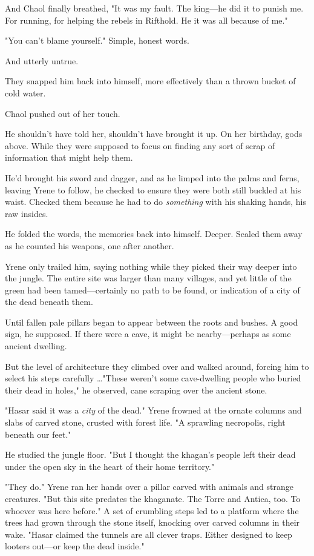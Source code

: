 And Chaol finally breathed, "It was my fault. The king---he did it to punish me. For running, for helping the rebels in Rifthold. He 
it was all because of me."

"You can't blame yourself." Simple, honest words.

And utterly untrue.

They snapped him back into himself, more effectively than a thrown bucket of cold water.

Chaol pushed out of her touch.

He shouldn't have told her, shouldn't have brought it up. On her birthday, gods above. While they were supposed to focus on finding any sort of scrap of information that might help them.

He'd brought his sword and dagger, and as he limped into the palms and ferns, leaving Yrene to follow, he checked to ensure they were both still buckled at his waist. Checked them because he had to do
\emph{something} with his shaking hands, his raw insides.

He folded the words, the memories back into himself. Deeper. Sealed them away as he counted his weapons, one after another.

Yrene only trailed him, saying nothing while they picked their way deeper into the jungle. The entire site was larger than many villages, and yet little of the green had been tamed---certainly no path to be found, or indication of a city of the dead beneath them.

Until fallen pale pillars began to appear between the roots and bushes. A good sign, he supposed. If there were a cave, it might be nearby---perhaps as some ancient dwelling.

But the level of architecture they climbed over and walked around, forcing him to select his steps carefully \ldots"These weren't some cave-dwelling people who buried their dead in holes," he observed, cane scraping over the ancient stone.

"Hasar said it was a \emph{city} of the dead." Yrene frowned at the ornate columns and slabs of carved stone, crusted with forest life. "A sprawling necropolis, right beneath our feet."

He studied the jungle floor. "But I thought the khagan's people left their dead under the open sky in the heart of their home territory."

"They do." Yrene ran her hands over a pillar carved with animals and strange creatures. "But  this site predates the khaganate. The Torre and Antica, too. To whoever was here before." A set of crumbling steps led to a platform where the trees had grown through the stone itself, knocking over carved columns in their wake. "Hasar claimed the tunnels are all clever traps. Either designed to keep looters out---or keep the dead inside."

